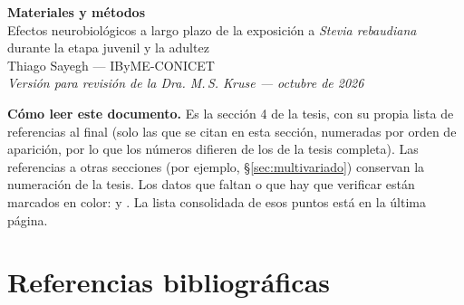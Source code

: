 \documentclass[12pt,a4paper,oneside]{report}
\begin{document}

\begin{center}
  {\Large\textbf{Materiales y métodos}}\\[0.6em]
  {\large Efectos neurobiológicos a largo plazo de la exposición a \textit{Stevia rebaudiana}\\ durante la etapa juvenil y la adultez}\\[0.6em]
  Thiago Sayegh --- IByME-CONICET\\[0.3em]
  \textit{Versión para revisión de la Dra. M.\,S. Kruse --- octubre de 2026}
\end{center}

\vspace{0.8em}
\noindent\textbf{Cómo leer este documento.} Es la sección 4 de la tesis, con su propia lista de referencias al final (solo las que se citan en esta sección, numeradas por orden de aparición, por lo que los números difieren de los de la tesis completa). Las referencias a otras secciones (por ejemplo, \S\ref{sec:multivariado}) conservan la numeración de la tesis. Los datos que faltan o que hay que verificar están marcados en color:  y . La lista consolidada de esos puntos está en la última página.

\clearpage
\setcounter{chapter}{3}


\chapter*{Referencias bibliográficas}
\printbibliography[heading=none]
\end{document}
